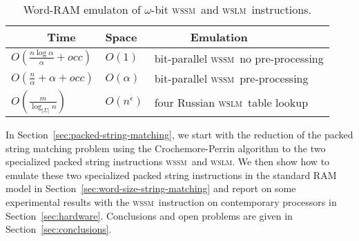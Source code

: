\documentclass[12pt]{article}
\newcommand{\W}{{\omega}}
\newcommand{\C}{{\alpha}}
\newcommand{\occ}{{\mathit{occ}}}
\newcommand{\wssm}{\textsc{wssm}}
\newcommand{\wslm}{\textsc{wslm}}
\begin{document}
\begin{table}[htb]
\begin{center}
   \begin{tabular}{ l l l}
     ~~~~~ Time    & Space& ~~~~~ Emulation \\ \hline
      $O(\frac{n \log \C}{\C}+\occ)$ & $O(1)$ & bit-parallel \wssm\  no pre-processing\\    
      $O(\frac{n}{\C}+\C+\occ)$ & $O(\C)$ & bit-parallel \wssm\ pre-processing\\
      $O(\frac{m}{\log_{|\Sigma|} n})$ & $O(n^\epsilon)$ & four Russian \wslm\ table lookup\\%
    \end{tabular}
\end{center}
\caption{\label{tab:results2}Word-RAM emulaton of $\W$-bit \wssm\ and \wslm\ instructions.}
\end{table}




In Section~\ref{sec:packed-string-matching}, 
we start with the reduction 
of the packed string matching problem using the Crochemore-Perrin algorithm
 to the two specialized packed string instructions {\wssm\ and \wslm}.
We then show how to emulate these two specialized packed string instructions
in the standard RAM model in Section~\ref{sec:word-size-string-matching} and 
report on some experimental results with the
\wssm\ instruction on contemporary processors in Section~\ref{sec:hardware}.
Conclusions and open problems are given in Section~\ref{sec:conclusions}.
\end{document}

